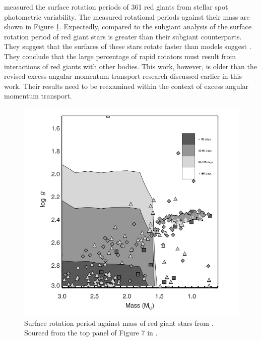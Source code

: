 \citet{ceillier_surface_2017} measured the surface rotation periods of 361 red giants from stellar spot photometric variability.
The measured rotational periods against their mass are shown in Figure \ref{fig:rgb_surface}.
Expectedly, compared to the subgiant analysis of \citet{santos_surface_2021} the surface rotation period of red giant stars is greater than their subgiant counterparts.
They suggest that the surfaces of these stars rotate faster than models suggest \citep{tayar_rapid_2015}.
They conclude that the large percentage of rapid rotators must result from interactions of red giants with other bodies.
This work, however, is older than the revised excess angular momentum transport research discussed earlier in this work.
Their results need to be reexamined within the context of excess angular momentum transport.

\begin{figure}[h]
    \includegraphics[width=\textwidth]{Figures/intro_figures/rgb_surface.png}
    \caption[Surface rotation period distribution of red giant stars]{Surface rotation period against mass of red giant stars from \citet{ceillier_surface_2017}.
    Sourced from the top panel of Figure 7 in \citet{ceillier_surface_2017}.}
    \label{fig:rgb_surface}
\end{figure}

